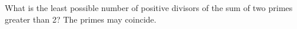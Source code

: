 What is the least possible number of positive divisors of the sum of two primes greater than 2? The primes may coincide.
